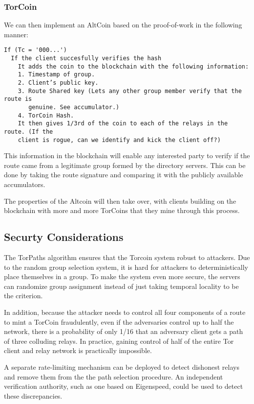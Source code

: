 \subsubsection{TorCoin}
We can then implement an AltCoin based on the proof-of-work in the following manner:
\begin{verbatim}
If (Tc = '000...')
  If the client succesfully verifies the hash
    It adds the coin to the blockchain with the following information:
    1. Timestamp of group.
    2. Client’s public key.
    3. Route Shared key (Lets any other group member verify that the route is 
       genuine. See accumulator.)
    4. TorCoin Hash.
    It then gives 1/3rd of the coin to each of the relays in the route. (If the 
    client is rogue, can we identify and kick the client off?)
\end{verbatim}
This information in the blockchain will enable any interested party to verify if the route came from a legitimate group formed by the directory servers. This can be done by taking the route signature and comparing it with the publicly available accumulators. 

The properties of the Altcoin will then take over, with clients building on the blockchain with more and more TorCoins that they mine through this process.

\subsection{Securty Considerations}
The TorPaths algorithm ensures that the Torcoin system robust to attackers. Due to the random group selection system, it is hard for attackers to deterministically place themselves in a group. To make the system even more secure, the servers can randomize group assignment instead of just taking temporal locality to be the criterion.

In addition, because the attacker needs to control all four components of a route to mint a TorCoin fraudulently, even if the adversaries control up to half the network, there is a probability of only 1/16 that an adversary client gets a path of three colluding relays. In practice, gaining control of half of the entire Tor client and relay network is practically impossible. 

A separate rate-limiting mechanism can be deployed to detect dishonest relays and remove them from the the path selection procedure. An independent verification authority, such as one based on Eigenspeed, could be used to detect these discrepancies.

